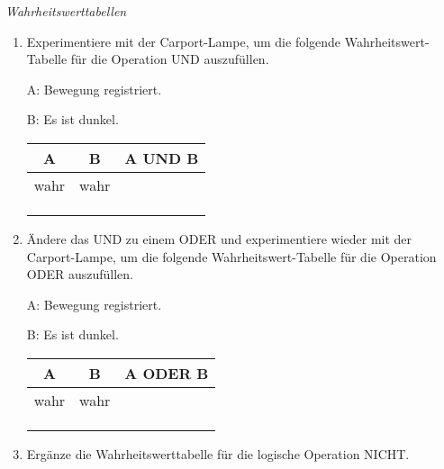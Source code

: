 \documentclass[ngerman, 11pt]{scrreprt}
\begin{document}
	\setcounter{chapter}{3}
	\setcounter{section}{3}

	\begin{aufgabe*} \emph{Wahrheitswerttabellen}
		\begin{enumerate}[label=\alph*), itemsep=0ex, parsep=0ex]
			\item Experimentiere mit der Carport-Lampe, um die folgende Wahrheitswert-Tabelle für die Operation UND auszufüllen.
			
			\medskip
			\begin{minipage}{0.4\textwidth}
				A: Bewegung registriert.
				
				B: Es ist dunkel.
			\end{minipage}
			\hfill
			\begin{minipage}{0.4\textwidth}
				\centering
				\begin{tabular}{c | c | c}
					\textbf{A} & \textbf{B} & \textbf{A UND B} \\ \hline
					wahr & wahr &  \\
					&  &  \\
					&  &  \\
					&  &  \\  
				\end{tabular}
			\end{minipage}
			\hfill
			
			\medskip
			\item Ändere das UND zu einem ODER und experimentiere wieder mit der Carport-Lampe, um die folgende Wahrheitswert-Tabelle für die Operation ODER auszufüllen.
			
			\medskip
			\begin{minipage}{0.4\textwidth}
				A: Bewegung registriert.
				
				B: Es ist dunkel.
			\end{minipage}
			\hfill
			\begin{minipage}{0.4\textwidth}
				\centering
				\begin{tabular}{c | c | c}
					\textbf{A} & \textbf{B} & \textbf{A ODER B} \\ \hline
					wahr & wahr &  \\
					&  &  \\
					&  &  \\
					&  &  \\  
				\end{tabular}
			\end{minipage}
			\hfill
			
			\medskip
			\item Ergänze die Wahrheitswerttabelle für die logische Operation NICHT.
			

\end{enumerate}
\end{aufgabe*}
\end{document}
